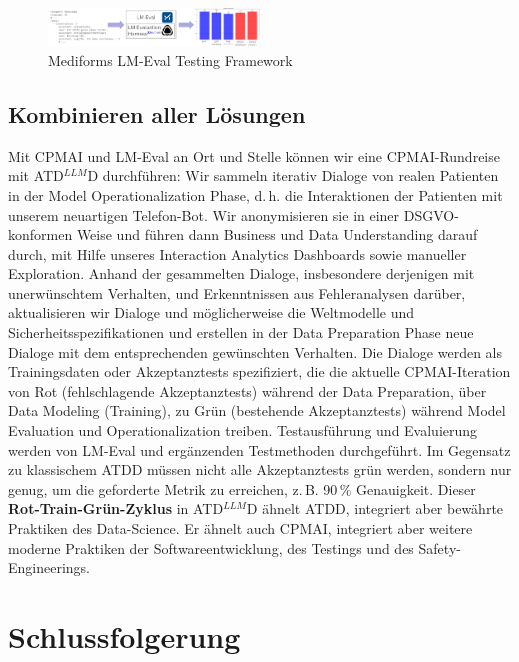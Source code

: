 \documentclass[twocolumn]{article}
\newcommand{\ATDLLMD}{ATD$^{LLM}$D}%
\begin{document}
\begin{figure}[hbt!]
  \begin{center}
\includegraphics[width=0.5\textwidth]{figures/LMEval2}
  \vspace{-8mm}
\caption{Mediforms LM-Eval Testing Framework}
\label{fig:lmeval}
\end{center}
\end{figure}

\subsection{Kombinieren aller Lösungen}

Mit CPMAI und LM-Eval an Ort und Stelle können wir eine CPMAI-Rundreise mit \ATDLLMD{} durchführen: Wir sammeln iterativ Dialoge von realen Patienten in der Model Operationalization Phase, d.\,h. die Interaktionen der Patienten mit unserem neuartigen Telefon-Bot. Wir anonymisieren sie in einer DSGVO-konformen Weise und führen dann Business und Data Understanding darauf durch, mit Hilfe unseres Interaction Analytics Dashboards sowie manueller Exploration. Anhand der gesammelten Dialoge, insbesondere derjenigen mit unerwünschtem Verhalten, und Erkenntnissen aus Fehleranalysen darüber, aktualisieren wir Dialoge und möglicherweise die Weltmodelle und Sicherheitsspezifikationen und erstellen in der Data Preparation Phase neue Dialoge mit dem entsprechenden gewünschten Verhalten. Die Dialoge werden als Trainingsdaten oder Akzeptanztests spezifiziert, die die aktuelle CPMAI-Iteration von Rot (fehlschlagende Akzeptanztests) während der Data Preparation, über Data Modeling (Training), zu Grün (bestehende Akzeptanztests) während Model Evaluation und Operationalization treiben. Testausführung und Evaluierung werden von LM-Eval und ergänzenden Testmethoden durchgeführt. Im Gegensatz zu klassischem ATDD müssen nicht alle Akzeptanztests grün werden, sondern nur genug, um die geforderte Metrik zu erreichen, z.\,B. 90\,\% Genauigkeit. Dieser \textbf{Rot-Train-Grün-Zyklus} in \ATDLLMD{} ähnelt ATDD, integriert aber bewährte Praktiken des Data-Science. Er ähnelt auch CPMAI, integriert aber weitere moderne Praktiken der Softwareentwicklung, des Testings und des Safety-Engineerings.

\section{Schlussfolgerung}
\end{document}
